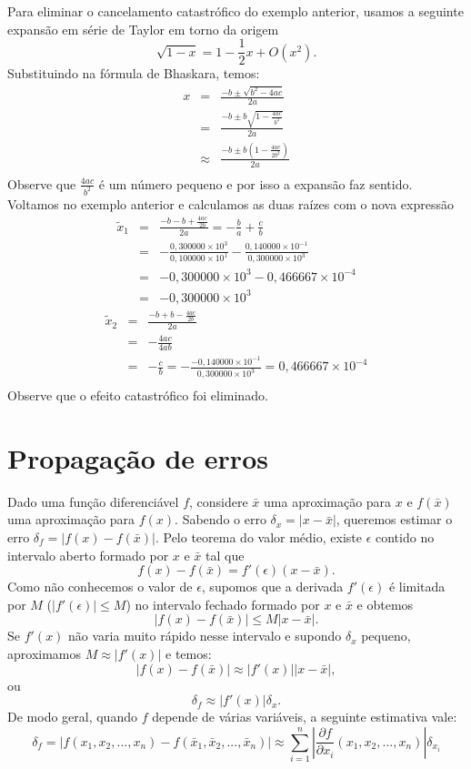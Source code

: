 \documentclass[main.tex]{subfiles}
\begin{document}
\begin{ex}Para eliminar o cancelamento catastrófico do exemplo anterior, usamos a seguinte expansão em série de Taylor em torno da origem
$$
\sqrt{1-x}=1-{\frac {1}{2}}x+O(x^2) .
$$
Substituindo na fórmula de Bhaskara, temos:
\begin{eqnarray*}
x&=&\frac{-b\pm \sqrt{b^2-4ac}}{2a}\\
&=&\frac{-b\pm b\sqrt{1-\frac{4ac}{b^2}}}{2a}\\
&\approx&\frac{-b\pm b\left(1-\frac{4ac}{2b^2}\right)}{2a}\\
\end{eqnarray*}
Observe que $\frac{4ac}{b^2}$ é um número pequeno e por isso a expansão faz sentido. Voltamos no exemplo anterior e calculamos as duas raízes com o nova expressão
\begin{eqnarray*}
\tilde{x}_1&=& \frac{-b- b+\frac{4ac}{2b}}{2a} = -\frac{b}{a}+\frac{c}{b}\\
&=& -\frac{0,300000\times 10^{3}}{0,100000\times 10^{1}}-\frac{0,140000\times 10^{-1}}{0,300000\times 10^3}\\
&=& -0,300000\times 10^{3}-0,466667\times 10^{-4}\\
&=& -0,300000\times 10^{3}
\end{eqnarray*}
\begin{eqnarray*}
\tilde{x}_2&=& \frac{-b+ b-\frac{4ac}{2b}}{2a}\\
&=&-\frac{4ac}{4ab}\\
&=&-\frac{c}{b}=-\frac{-0,140000\times 10^{-1}}{0,300000\times 10^3}=0,466667\times 10^{-4}\\
\end{eqnarray*}
Observe que o efeito catastrófico foi eliminado.
\end{ex}



\section{Propagação de erros}


Dado uma função diferenciável $f$, considere $\bar{x}$ uma aproximação para $x$ e $f(\bar{x})$ uma aproximação para $f(x)$. Sabendo o erro $\delta_x=|x-\bar{x}|$, queremos estimar o erro $\delta_f=|f(x)-f(\bar{x})|$. Pelo teorema do valor médio, existe $\epsilon$ contido no intervalo aberto formado por $x$ e $\bar{x}$ tal que
$$
f(x)-f(\bar{x})=f'(\epsilon)(x-\bar{x}).
$$
Como não conhecemos o valor de $\epsilon$, supomos que a derivada $f'(\epsilon)$ é limitada por $M$ ($|f'(\epsilon)|\leq M$) no intervalo fechado formado por $x$ e $\bar{x}$ e obtemos
$$
|f(x)-f(\bar{x})|\leq M|x-\bar{x}|.
$$
Se $f'(x)$ não varia muito rápido nesse intervalo e supondo $\delta_x$ pequeno, aproximamos $M\approx |f'(x)|$ e temos:
$$
|f(x)-f(\bar{x})|\approx |f'(x)||x-\bar{x}|,
$$
ou
$$
\delta_f\approx |f'(x)|\delta_x.
$$
De modo geral, quando $f$ depende de várias variáveis, a seguinte estimativa vale:
$$
\delta_f=|f(x_1,x_2,...,x_n)-f(\bar{x}_1, \bar{x}_2,...,\bar{x}_n)|\approx \sum_{i=1}^n\left|\frac{\partial f}{\partial x_i}(x_1, x_2,...,x_n)\right|\delta_{x_i}
$$
\end{document}
